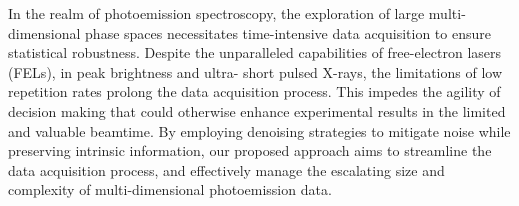 
In the realm of photoemission spectroscopy, the exploration of large multi-dimensional phase spaces necessitates time-intensive data acquisition to ensure statistical robustness. Despite the unparalleled capabilities of free-electron lasers (FELs), in peak brightness and ultra- short pulsed X-rays, the limitations of low repetition rates prolong the data acquisition process. This impedes the agility of decision making that could otherwise enhance experimental results in the limited and valuable beamtime. By employing denoising strategies to mitigate noise while preserving intrinsic information, our proposed approach aims to streamline the data acquisition process, and effectively manage the escalating size and complexity of multi-dimensional photoemission data.

